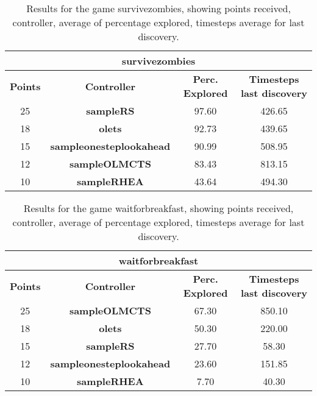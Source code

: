 \begin{table*}[!t]
\begin{center}
\begin{tabular}{|c|c|c|c|}
\multicolumn{4}{c}{\textbf{survivezombies}}\\
\hline
\textbf{Points} & \textbf{Controller} & \textbf{Perc. Explored} &  \textbf{Timesteps last discovery}\\
\hline
25 & \textbf{sampleRS} & 97.60 & 426.65
 \\
\hline
18 & \textbf{olets} & 92.73 & 439.65
 \\
\hline
15 & \textbf{sampleonesteplookahead} & 90.99 & 508.95
 \\
\hline
12 & \textbf{sampleOLMCTS} & 83.43 & 813.15
 \\
\hline
10 & \textbf{sampleRHEA} & 43.64 & 494.30
 \\
\hline
\end{tabular}
\caption{Results for the game survivezombies, showing points received, controller, average of percentage explored, timesteps average for last discovery.}
\label{tab:weights}
\end{center}
\end{table*}
\begin{table*}[!t]
\begin{center}
\begin{tabular}{|c|c|c|c|}
\multicolumn{4}{c}{\textbf{waitforbreakfast}}\\
\hline
\textbf{Points} & \textbf{Controller} & \textbf{Perc. Explored} &  \textbf{Timesteps last discovery}\\
\hline
25 & \textbf{sampleOLMCTS} & 67.30 & 850.10
 \\
\hline
18 & \textbf{olets} & 50.30 & 220.00
 \\
\hline
15 & \textbf{sampleRS} & 27.70 & 58.30
 \\
\hline
12 & \textbf{sampleonesteplookahead} & 23.60 & 151.85
 \\
\hline
10 & \textbf{sampleRHEA} & 7.70 & 40.30
 \\
\hline
\end{tabular}
\caption{Results for the game waitforbreakfast, showing points received, controller, average of percentage explored, timesteps average for last discovery.}
\label{tab:weights}
\end{center}
\end{table*}

